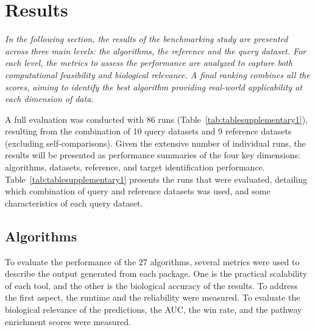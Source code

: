 ﻿%

%


\chapter{Results}
\label{cha:results}

\textit{In the following section, the results of the benchmarking study are presented across three main levels: the algorithms, the reference and the query dataset. For each level, the metrics to assess the performance are analyzed to capture both computational feasibility and biological relevance. A final ranking combines all the scores, aiming to identify the best algorithm providing real-world applicability at each dimension of data.}



A full evaluation was conducted with 86 runs (Table~\ref{tab:tablesupplementary1}), resulting from the combination of 10 query datasets and 9 reference datasets (excluding self-comparisons). Given the extensive number of individual runs, the results will be presented as performance summaries of the four key dimensions: algorithms, datasets, reference, and target identification performance. Table~\ref{tab:tablesupplementary1} presents the runs that were evaluated, detailing which combination of query and reference datasets was used, and some characteristics of each query dataset.

\section{Algorithms} %
\label{sec:algorithmsresults}

To evaluate the performance of the 27 algorithms, several metrics were used to describe the output generated from each package.
One is the practical scalability of each tool, and the other is the biological accuracy of the results.
To address the first aspect, the runtime and the reliability were measured.
To evaluate the biological relevance of the predictions, the \gls{AUC}, the win rate, and the pathway enrichment scores were measured.

